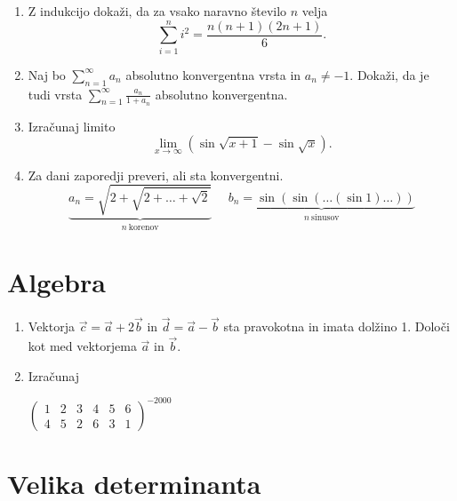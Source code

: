 \documentclass[a4paper,12pt]{article}
\begin{document}
\begin{enumerate}
\item
Z indukcijo dokaži, da za vsako naravno število \(n\) velja
\[
\sum_{i=1}^{n}i^2 = \frac{n(n+1)(2n+1)}{6}.
\]

\item
Naj bo \(\sum_{n=1}^{\infty} a_n\) absolutno konvergentna vrsta in \(a_n \ne -1\).
Dokaži, da je tudi vrsta \(\sum_{n=1}^\infty \frac{a_n}{1+a_n}\)
absolutno konvergentna.

\item
Izračunaj limito
\[
\lim_{x\rightarrow\infty}(\sin \sqrt{x+1} - \sin \sqrt{x}).
\]

\item
Za dani zaporedji preveri, ali sta konvergentni.
\[
\underbrace {a_n = \sqrt{2+\sqrt{2+\dots+\sqrt{2}}}}_{n~ \text{korenov}} 
~~~~~~
\underbrace{b_n = \sin(\sin(\dots(\sin 1)\dots))}_{n~ \text{sinusov}}
\]
\end{enumerate}

\section*{Algebra}

\begin{enumerate}
\item
Vektorja \(\vec{c}=\vec{a}+2\vec{b}\) in \(\vec{d}=\vec{a}-\vec{b}\)
sta pravokotna in imata dolžino 1. Določi kot med vektorjema \(\vec{a}\) in \(\vec{b}\).

\item
Izračunaj

\(\displaystyle \begin{pmatrix}1 & 2 & 3 & 4 & 5 & 6 \\ 4 & 5 & 2 & 6 & 3 & 1\end{pmatrix}^{-2000}\)
  
\end{enumerate}

\section*{Velika determinanta}
\end{document}
